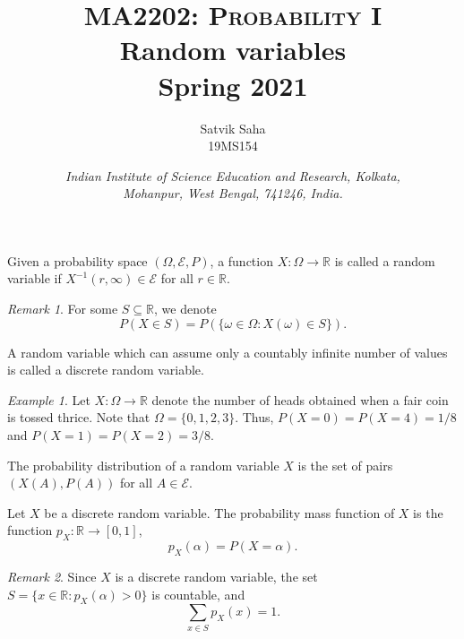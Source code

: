 \documentclass[11pt]{article}
\title{
    \Large\textsc{MA2202: Probability I} \\
    \Huge \textbf{Random variables} \\
    \vspace{5pt}
    \Large{Spring 2021}
}
\author{
    \large Satvik Saha%
    \\\textsc{\small 19MS154}
}
\date{\normalsize
    \textit{Indian Institute of Science Education and Research, Kolkata, \\
    Mohanpur, West Bengal, 741246, India.} \\
}
\def\R{\mathbb{R}}
\theoremstyle{definition}
\theoremstyle{remark}
\newtheorem*{remark}{Remark}
\newtheorem*{example}{Example}
\numberwithin{equation}{module}
\begin{document}
    \maketitle

    \begin{definition}
        Given a probability space $(\Omega, \mathcal{E}, P)$, a function $X\colon
        \Omega \to \R$ is called a random variable if $X^{-1}(r, \infty)
        \in \mathcal{E}$ for all $r \in \R$.

        \begin{remark}
            For some $S \subseteq \R$, we denote \[
                P(X \in S) = P(\{\omega \in \Omega\colon X(\omega) \in S\}).
            \] 
        \end{remark}
    \end{definition}
    
    \begin{definition}
        A random variable which can assume only a countably infinite number of
        values is called a discrete random variable.
    \end{definition}
    \begin{example}
        Let $X\colon \Omega \to \R$ denote the number of heads obtained when a fair
        coin is tossed thrice. Note that $\Omega = \{0, 1, 2, 3\}$. Thus, 
        $P(X = 0) = P(X = 4) = 1 /8$ and $P(X = 1) = P(X = 2) = 3 /8$.
    \end{example}

    \begin{definition}
        The probability distribution of a random variable $X$ is the set of pairs
        $(X(A), P(A))$ for all $A \in \mathcal{E}$.
    \end{definition}

    \begin{definition}
        Let $X$ be a discrete random variable. The probability mass function of $X$
        is the function $p_X\colon \R \to [0, 1]$, \[
            p_X(\alpha) = P(X = \alpha).
        \]

        \begin{remark}
            Since $X$ is a discrete random variable, the set $S = \{x \in \R \colon
            p_X(\alpha) > 0\}$ is countable, and \[
                \sum_{x \in S} p_X(x) = 1.
            \] 
        \end{remark}
    \end{definition}
    
\end{document}
